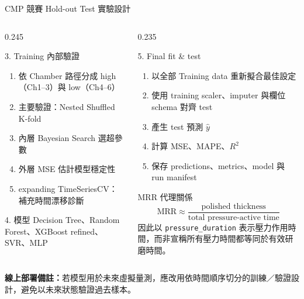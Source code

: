 \begin{frame}{CMP 競賽 Hold-out Test 實驗設計}
\begin{columns}[T,totalwidth=\textwidth]
\begin{column}{0.245\textwidth}
  \begin{block}{3. Training 內部驗證}
    \begin{enumerate}\setlength{\itemsep}{2pt}
      \item 依 Chamber 路徑分成 high（Ch1--3）與 low（Ch4--6）
      \item 主要驗證：Nested Shuffled K-fold
      \item 內層 Bayesian Search 選超參數
      \item 外層 MSE 估計模型穩定性
      \item expanding TimeSeriesCV：補充時間漂移診斷
    \end{enumerate}
  \end{block}

  \begin{block}{4. 模型}
    Decision Tree、Random Forest、XGBoost refined、SVR、MLP
  \end{block}
\end{column}

\begin{column}{0.235\textwidth}
  \begin{block}{5. Final fit \& test}
    \begin{enumerate}\setlength{\itemsep}{2pt}
      \item 以全部 Training data 重新擬合最佳設定
      \item 使用 training scaler、imputer 與欄位 schema 對齊 test
      \item 產生 test 預測 \(\hat y\)
      \item 計算 MSE、MAPE、\(R^2\)
      \item 保存 predictions、metrics、model 與 run manifest
    \end{enumerate}
  \end{block}

  \begin{block}{MRR 代理關係}
    \[
      \mathrm{MRR}\approx
      \frac{\text{polished thickness}}
      {\text{total pressure-active time}}
    \]
    因此以 \texttt{pressure\_duration} 表示壓力作用時間，而非宣稱所有壓力時間都等同於有效研磨時間。
  \end{block}
\end{column}

\end{columns}

\vspace{2pt}
\centering
\scriptsize
\textbf{線上部署備註：}若模型用於未來虛擬量測，應改用依時間順序切分的訓練／驗證設計，避免以未來狀態驗證過去樣本。

\end{frame}
